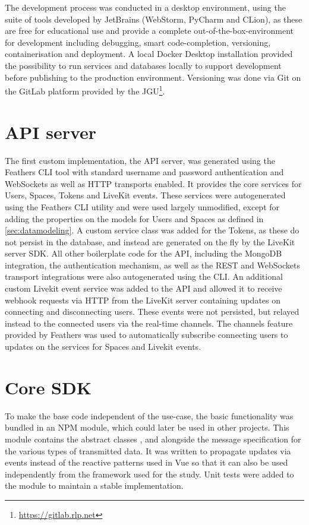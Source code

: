 The development process was conducted in a desktop environment, using the suite of tools developed by JetBrains (WebStorm, PyCharm and CLion), as these are free for educational use and provide a complete out-of-the-box-environment for development including debugging, smart code-completion, versioning, containerisation and deployment.
A local Docker Desktop installation provided the possibility to run services and databases locally to support development before publishing to the production environment.
Versioning was done via Git on the GitLab platform provided by the \ac{JGU}\footnote{\url{https://gitlab.rlp.net}}.

\section{API server}

The first custom implementation, the \ac{API} server, was generated using the Feathers \ac{CLI} tool with standard username and password authentication and WebSockets as well as \ac{HTTP} transports enabled.
It provides the core services for Users, Spaces, Tokens and LiveKit events.
These services were autogenerated using the Feathers \ac{CLI} utility and were used largely unmodified, except for adding the properties on the models for Users and Spaces as defined in \autoref{sec:datamodeling}.
A custom service class was added for the Tokens, as these do not persist in the database, and instead are generated on the fly by the LiveKit server \ac{SDK}.
All other boilerplate code for the \ac{API}, including the MongoDB integration, the authentication mechanism, as well as the REST and WebSockets transport integrations were also autogenerated using the \ac{CLI}.
An additional custom Livekit event service was added to the API and allowed it to receive webhook requests via \ac{HTTP} from the LiveKit server containing updates on connecting and disconnecting users.
These events were not persisted, but relayed instead to the connected users via the real-time channels.
The channels feature provided by Feathers was used to automatically subscribe connecting users to updates on the services for Spaces and Livekit events.

\section{Core SDK}

To make the base code independent of the use-case, the basic functionality was bundled in an \ac{NPM} module, which could later be used in other projects.
This module contains the abstract classes ,  and  alongside the message specification for the various types of transmitted data.
It was written to propagate updates via events instead of the reactive patterns used in Vue so that it can also be used independently from the framework used for the study.
Unit tests were added to the module to maintain a stable implementation.

